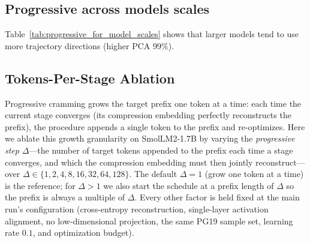 \subsection{Progressive across models scales}

Table~\ref{tab:progressive_for_model_scales} shows that larger models tend to use more trajectory directions (higher PCA 99\%).


\begin{table}[tb]
    \caption{Progressive cramming trajectory statistics on PG19. ``Compressed Tokens'' is the achieved prefix length $n$, ``Trajectory Length'' is $L_{\text{traj}}$, and ``PCA 99\%'' is the number of principal components explaining 99\% of trajectory variance.}
    \label{tab:progressive_for_model_scales}
    \begin{center}
    \begin{small}
    
    \end{small}
    \end{center}
    \vskip -0.1in

\end{table}

\subsection{Tokens-Per-Stage Ablation}
\label{app:added_tokens_ablation}

Progressive cramming grows the target prefix one token at a time: each time the current stage converges (its compression embedding perfectly reconstructs the prefix), the procedure appends a single token to the prefix and re-optimizes. Here we ablate this growth granularity on SmolLM2-1.7B by varying the \emph{progressive step} $\Delta$---the number of target tokens appended to the prefix each time a stage converges, and which the compression embedding must then jointly reconstruct---over $\Delta \in \{1, 2, 4, 8, 16, 32, 64, 128\}$. The default $\Delta = 1$ (grow one token at a time) is the reference; for $\Delta > 1$ we also start the schedule at a prefix length of $\Delta$ so the prefix is always a multiple of $\Delta$. Every other factor is held fixed at the main run's configuration (cross-entropy reconstruction, single-layer activation alignment, no low-dimensional projection, the same PG19 sample set, learning rate $0.1$, and optimization budget).


